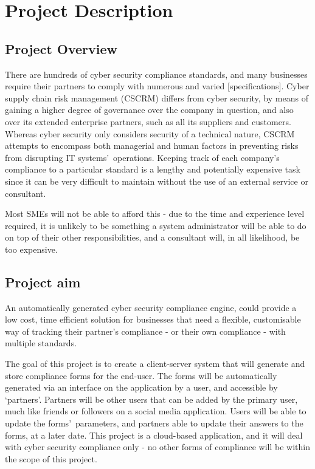 \chapter{Project Description} \label{Chapter:one}
    \section{Project Overview}
        There are hundreds of cyber security compliance standards, and many businesses require their partners to comply with numerous and varied [specifications]. Cyber supply chain risk management (CSCRM) differs from cyber security, by means of gaining a higher degree of governance over the company in question, and also over its extended enterprise partners, such as all its suppliers and customers. Whereas cyber security only considers security of a technical nature, CSCRM attempts to encompass both managerial and human factors in preventing risks from disrupting IT systems\textquoteright\ operations. \cite{CSCRM} Keeping track of each company\textquoteright s compliance to a particular standard is a lengthy and potentially expensive task since it can be very difficult to maintain without the use of an external service or consultant.

        Most SMEs will not be able to afford this - due to the time and experience level required, it is unlikely to be something a system administrator will be able to do on top of their other responsibilities, and a consultant will, in all likelihood, be too expensive.

    \section{Project aim}
        An automatically generated cyber security compliance engine, could provide a low cost, time efficient solution for businesses that need a flexible, customisable way of tracking their partner\textquoteright s compliance - or their own compliance - with multiple standards.

        The goal of this project is to create a client-server system that will generate and store compliance forms for the end-user. The forms will be automatically generated via an interface on the application by a user, and accessible by \textquoteleft partners\textquoteright. Partners will be other users that can be added by the primary user, much like friends or followers on a social media application. Users will be able to update the forms\textquoteright\ parameters, and partners able to update their answers to the forms, at a later date. This project is a cloud-based application, and it will deal with cyber security compliance only - no other forms of compliance will be within the scope of this project.
